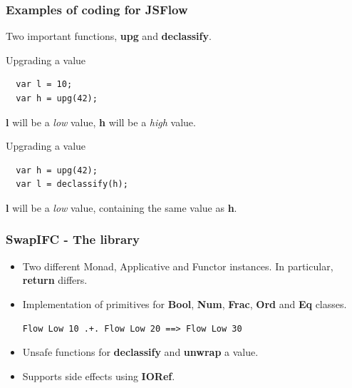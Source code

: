 \documentclass{beamer}
\begin{document}
\begin{frame}[fragile]
  \frametitle{Examples of coding for JSFlow}
  Two important functions, \textbf{upg} and \textbf{declassify}.
  \pause
  \begin{block}{Upgrading a value}
\begin{verbatim}
  var l = 10;
  var h = upg(42);
\end{verbatim}
  \end{block}
  \textbf{l} will be a \emph{low} value, \textbf{h} will be a \emph{high} value.
  \pause
  \begin{block}{Upgrading a value}
\begin{verbatim}
  var h = upg(42);
  var l = declassify(h);
\end{verbatim}
  \end{block}
  \textbf{l} will be a \emph{low} value, containing the same value as \textbf{h}.
\end{frame}


\begin{frame}[fragile]
  \frametitle{SwapIFC - The library}
  \begin{itemize}
    \item Two different Monad, Applicative and Functor instances. In particular, \textbf{return} differs. \pause
    \item Implementation of primitives for \textbf{Bool}, \textbf{Num}, \textbf{Frac}, \textbf{Ord} and \textbf{Eq} classes. \pause
\begin{verbatim}
Flow Low 10 .+. Flow Low 20 ==> Flow Low 30
\end{verbatim}
\pause
    \item Unsafe functions for \textbf{declassify} and \textbf{unwrap} a value. \pause
    \item Supports side effects using \textbf{IORef}.
  \end{itemize}
\end{frame}

\end{document}
